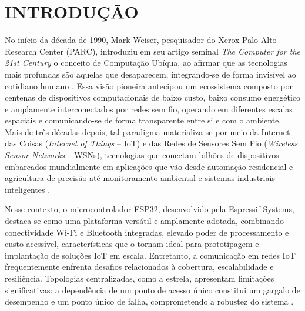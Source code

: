 \chapter{INTRODUÇÃO}\label{introduuxe7uxe3o}

No início da década de 1990, Mark Weiser, pesquisador do Xerox Palo Alto
Research Center (PARC), introduziu em seu artigo seminal \emph{The
Computer for the 21st Century} o conceito de Computação Ubíqua, ao
afirmar que as tecnologias mais profundas são aquelas que desaparecem,
integrando-se de forma invisível ao cotidiano humano \cite{weiser1991}.
Essa visão pioneira antecipou um ecossistema composto por centenas de
dispositivos computacionais de baixo custo, baixo consumo energético e
amplamente interconectados por redes sem fio, operando em diferentes
escalas espaciais e comunicando-se de forma transparente entre si e com
o ambiente. Mais de três décadas depois, tal paradigma materializa-se
por meio da Internet das Coisas (\emph{Internet of Things} -- IoT) e das
Redes de Sensores Sem Fio (\emph{Wireless Sensor Networks} -- WSNs),
tecnologias que conectam bilhões de dispositivos embarcados mundialmente
em aplicações que vão desde automação residencial e agricultura de
precisão até monitoramento ambiental e sistemas industriais inteligentes
\cite{priyadarshi2025}.

Nesse contexto, o microcontrolador ESP32, desenvolvido pela Espressif
Systems, destaca-se como uma plataforma versátil e amplamente adotada,
combinando conectividade Wi-Fi e Bluetooth integradas, elevado poder de
processamento e custo acessível, características que o tornam ideal para
prototipagem e implantação de soluções IoT em escala. Entretanto, a
comunicação em redes IoT frequentemente enfrenta desafios relacionados à
cobertura, escalabilidade e resiliência. Topologias centralizadas, como
a estrela, apresentam limitações significativas: a dependência de um
ponto de acesso único constitui um gargalo de desempenho e um ponto
único de falha, comprometendo a robustez do sistema \cite{chaizeng2021}.

